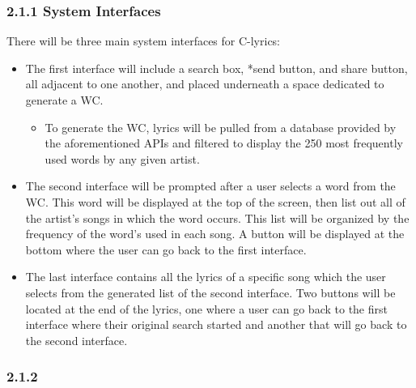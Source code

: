 \documentclass[]{article}
\begin{document}
\subsubsection{2.1.1 System Interfaces}\label{system-interfaces}

There will be three main system interfaces for C-lyrics:

\begin{itemize}
\item
  The first interface will include a search box, *send button, and share
  button, all adjacent to one another, and placed underneath a space
  dedicated to generate a WC.

  \begin{itemize}
  \itemsep1pt\parskip0pt
  \item
    To generate the WC, lyrics will be pulled from a database provided
    by the aforementioned APIs and filtered to display the 250 most
    frequently used words by any given artist.
  \end{itemize}
\item
  The second interface will be prompted after a user selects a word from
  the WC. This word will be displayed at the top of the screen, then
  list out all of the artist's songs in which the word occurs. This list
  will be organized by the frequency of the word's used in each song. A
  button will be displayed at the bottom where the user can go back to
  the first interface.
\item
  The last interface contains all the lyrics of a specific song which
  the user selects from the generated list of the second interface. Two
  buttons will be located at the end of the lyrics, one where a user can
  go back to the first interface where their original search started and
  another that will go back to the second interface.
\end{itemize}

\subsubsection{2.1.2}\label{section}
\end{document}
